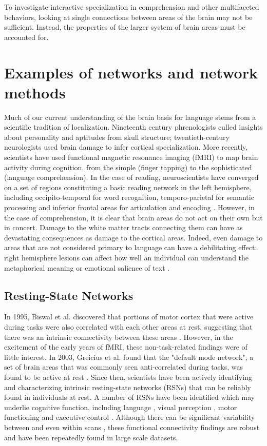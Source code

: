 To investigate interactive specialization in comprehension and other multifaceted behaviors, looking at single connections between areas of the brain may not be sufficient. Instead, the properties of the larger system of brain areas must be accounted for. 

\section{Examples of networks and network methods}

Much of our current understanding of the brain basis for language stems from a scientific tradition of localization. Nineteenth century phrenologists culled insights about personality and aptitudes from skull structure; twentieth-century neurologists used brain damage to infer cortical specialization. More recently, scientists have used functional magnetic resonance imaging (fMRI) to map brain activity during cognition, from the simple (finger tapping) to the sophisticated (language comprehension). In the case of reading, neuroscientists have converged on a set of regions constituting a basic reading network in the left hemisphere, including occipito-temporal for word recognition, temporo-parietal for semantic processing and inferior frontal areas for articulation and encoding  \cite{Price2012}. However, in the case of comprehension, it is clear that brain areas do not act on their own but in concert. Damage to the white matter tracts connecting them can have as devastating consequences as damage to the cortical areas. Indeed, even damage to areas that are not considered primary to language can have a debilitating effect: right hemisphere lesions can affect how well an individual can understand the metaphorical meaning or emotional salience of text \cite{Ferstl2008, Vigneau2011}.

\subsection{Resting-State Networks}
In 1995, Biswal et al. discovered that portions of motor cortex that were active during tasks were also correlated with each other areas at rest, suggesting that there was an intrinsic connectivity between these areas \cite{Biswal1995}. However, in the excitement of the early years of fMRI, these non-task-related findings were of little interest. In 2003, Greicius et al. found that the "default mode network", a set of brain areas that was commonly seen anti-correlated during tasks, was found to be active at rest \cite{Greicius2003}. Since then, scientists have been actively identifying and characterizing intrinsic resting-state networks (RSNs) that can be reliably found in individuals at rest. A number of RSNs have been identified which may underlie cognitive function, including language \cite{Cordes2000, Hampson2002}, visual perception \cite{Cordes2000, Simmons2012}, motor functioning \cite{Biswal1995} and executive control \cite{Seeley2007, Simmons2012}. Although there can be significant variability between and even within scans \cite{Honey2009}, these functional connectivity findings are robust and have been repeatedly found in large scale datasets.

